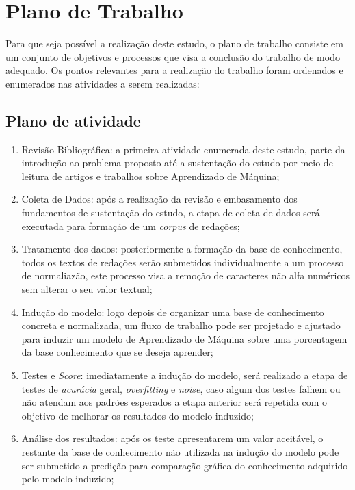 \chapter{Plano de Trabalho}\label{plano}

Para que seja possível a realização deste estudo, o plano de trabalho consiste em um conjunto de objetivos e processos que visa a conclusão do trabalho de modo adequado. Os pontos relevantes para a realização do trabalho foram ordenados e enumerados nas atividades a serem realizadas:

\section{Plano de atividade}

\begin{enumerate}
\item Revisão Bibliográfica: a primeira atividade enumerada deste estudo, parte da introdução ao problema proposto até a sustentação do estudo por meio de leitura de artigos e trabalhos sobre Aprendizado de Máquina;

\item Coleta de Dados: após a realização da revisão e embasamento dos fundamentos de sustentação do estudo,
a etapa de coleta de dados será executada para formação de um \textit{corpus} de redações;

\item Tratamento dos dados: posteriormente a formação da base de conhecimento, todos os textos de redações serão submetidos individualmente a um processo de normaliazão, este processo visa a remoção de caracteres não alfa numéricos sem alterar o seu valor textual; 

\item Indução do modelo: logo depois de organizar uma base de conhecimento concreta e normalizada, um fluxo de trabalho pode ser projetado e ajustado para induzir um modelo de Aprendizado de Máquina sobre uma porcentagem da base conhecimento que se deseja aprender;

\item Testes e \textit{Score}: imediatamente a indução do modelo, será realizado a etapa de testes de \textit{acurácia} geral, \textit{overfitting} e \textit{noise}, caso algum dos testes falhem ou não atendam aos padrões esperados a etapa anterior será repetida com o objetivo de melhorar os resultados do modelo induzido;

\item Análise dos resultados: após os teste apresentarem um valor aceitável, o restante da base de conhecimento não utilizada na indução do modelo pode ser submetido a predição para comparação gráfica do conhecimento adquirido pelo modelo induzido;


\end{enumerate}
